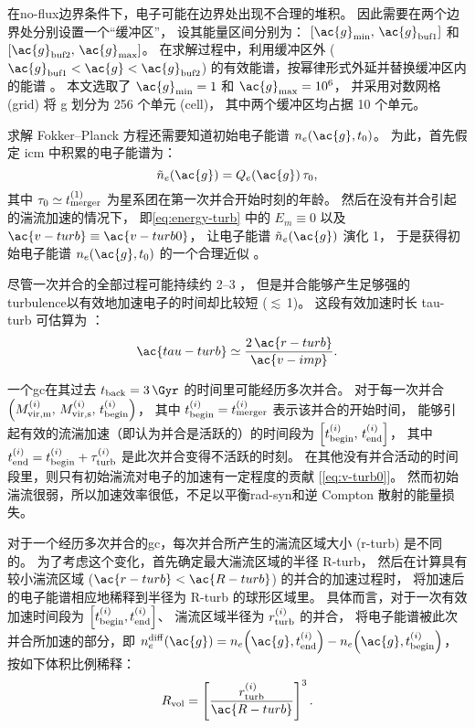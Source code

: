 在\ac{no-flux}边界条件下，电子可能在边界处出现不合理的堆积。
因此需要在两个边界处分别设置一个\enquote{缓冲区}，
设其能量区间分别为：
$[\ac{g}_{\R{min}}, \,\ac{g}_{\R{buf1}}]$ 和
$[\ac{g}_{\R{buf2}}, \,\ac{g}_{\R{max}}]$。
在求解过程中，利用缓冲区外 ($\ac{g}_{\R{buf1}} < \ac{g} < \ac{g}_{\R{buf2}}$)
的有效能谱，按幂律形式外延并替换缓冲区内的能谱 \cite{borovsky1986,donnert2014}。
本文选取了 $\ac{g}_{\R{min}} = 1$ 和 $\ac{g}_{\R{max}} = \num{e6}$，
并采用对数网格 (grid) 将 \ac{g} 划分为 256 个单元 (cell)，
其中两个缓冲区均占据 10 个单元。

求解 Fokker--Planck 方程还需要知道初始电子能谱 $n_e(\ac{g}, t_0)$。
为此，首先假定 \ac{icm} 中积累的电子能谱为：
\begin{equation}
  \tilde{n}_e(\ac{g}) = Q_e(\ac{g}) \,\tau_0 ,
\end{equation}
其中 $\tau_0 \simeq t_{\mathrm{merger}}^{(1)}$ 为星系团在第一次并合开始时刻的年龄。
然后在没有并合引起的湍流加速的情况下，
即\autoref{eq:energy-turb} 中的 $E_m \equiv 0$ 以及
$\ac{v-turb} \equiv \ac{v-turb0}$，
让电子能谱 $\tilde{n}_e(\ac{g})$ 演化 \SI{1}{\Gyr}，
于是获得初始电子能谱 $n_e(\ac{g}, t_0)$ 的一个合理近似 \cite{brunetti2007}。

尽管一次并合的全部过程可能持续约 \SIrange{2}{3}{\Gyr} \cite{tormen2004,cassano2016}，
但是并合能够产生足够强的\ac{turbulence}以有效地加速电子的时间却比较短
($\lesssim$\,\SI{1}{\Gyr})。
这段有效加速时长 \ac{tau-turb} 可估算为 \cite{miniati2015}：
\begin{equation}
  \ac{tau-turb} \simeq \frac{2\,\ac{r-turb}}{\ac{v-imp}} .
\end{equation}

一个\ac{gc}在其过去 $t_{\R{back}} = \SI{3}{\Gyr}$ 的时间里可能经历多次并合。
对于每一次并合 $\left( M^{(i)}_{\mathrm{vir,m}},\, M^{(i)}_{\mathrm{vir,s}},\,
t^{(i)}_{\mathrm{begin}} \right)$，
其中 $t^{(i)}_{\mathrm{begin}} = t^{(i)}_{\mathrm{merger}}$ 表示该并合的开始时间，
能够引起有效的流湍加速（即认为并合是活跃的）的时间段为
$\left[ t^{(i)}_{\mathrm{begin}},\, t^{(i)}_{\mathrm{end}} \right]$，
其中 $t^{(i)}_{\mathrm{end}} = t^{(i)}_{\mathrm{begin}}+\tau^{(i)}_{\mathrm{turb}}$
是此次并合变得不活跃的时刻。
在其他没有并合活动的时间段里，则只有初始湍流对电子的加速有一定程度的贡献
[\autoref{eq:v-turb0}]。
然而初始湍流很弱，所以加速效率很低，不足以平衡\ac{rad-syn}和逆 Compton 散射的能量损失。

对于一个经历多次并合的\ac{gc}，每次并合所产生的湍流区域大小 (\ac{r-turb}) 是不同的。
为了考虑这个变化，首先确定最大湍流区域的半径 \ac{R-turb}，
然后在计算具有较小湍流区域 ($\ac{r-turb} < \ac{R-turb}$) 的并合的加速过程时，
将加速后的电子能谱相应地稀释到半径为 \ac{R-turb} 的球形区域里。
具体而言，对于一次有效加速时间段为
$\left[ t^{(i)}_{\mathrm{begin}}, t^{(i)}_{\mathrm{end}} \right]$、
湍流区域半径为 $r^{(i)}_{\mathrm{turb}}$ 的并合，
将电子能谱被此次并合所加速的部分，即
$n_e^{\R{diff}}(\ac{g}) =
n_e\!\left(\ac{g}, t^{(i)}_{\R{end}}\right) -
n_e\!\left(\ac{g}, t^{(i)}_{\R{begin}}\right)$，
按如下体积比例稀释：
\begin{equation}
  \label{eq:ratio-v}
  R_{\R{vol}} = \left[ \frac{r^{(i)}_{\R{turb}}}{\ac{R-turb}} \right]^3 .
\end{equation}

